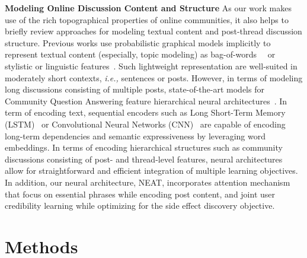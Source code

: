 \documentclass{bmcart}
\begin{document}
{\bf Modeling Online Discussion Content and Structure}
As our work makes use of the rich topographical properties of online communities, it also helps to briefly review approaches for modeling textual content and post-thread discussion structure. Previous works use probabilistic graphical models implicitly to represent textual content (especially, topic modeling) as bag-of-words~\cite{yates2015extracting}~\cite{wang2014sideeffectptm} or stylistic or linguistic features~\cite{mukherjee2014people}.
Such lightweight representation are well-suited in moderately short contexts, \textit{i.e.,} sentences or posts. However, in terms of modeling long discussions consisting of multiple posts, state-of-the-art models for
Community Question Answering feature hierarchical neural architectures~\cite{qiu2015convolutional,zhou2018recurrent,zhang2017attentive}. In term of encoding text, sequential encoders such as 
Long Short-Term Memory (LSTM)~\cite{hochreiter1997long} or Convolutional Neural Networks (CNN)~\cite{kim2014convolutional} are capable of encoding long-term dependencies and semantic expressiveness by leveraging word embeddings. In terms of encoding hierarchical structures such as community discussions consisting of post- and thread-level features, neural architectures allow for straightforward and efficient integration of multiple learning objectives. In addition, our neural architecture, NEAT, incorporates attention mechanism that focus on essential phrases while encoding post content, and joint user credibility learning while optimizing for the side effect discovery objective.

\section{Methods}\label{sec:proposed_method}
\end{document}
